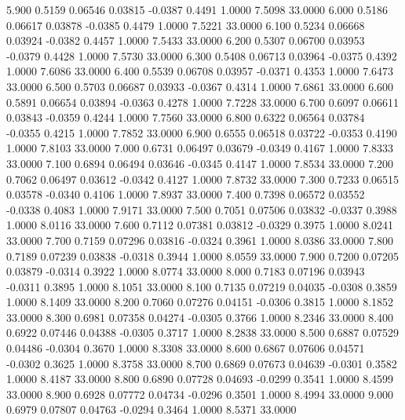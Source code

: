    5.900   0.5159   0.06546   0.03815  -0.0387   0.4491   1.0000   7.5098  33.0000
   6.000   0.5186   0.06617   0.03878  -0.0385   0.4479   1.0000   7.5221  33.0000
   6.100   0.5234   0.06668   0.03924  -0.0382   0.4457   1.0000   7.5433  33.0000
   6.200   0.5307   0.06700   0.03953  -0.0379   0.4428   1.0000   7.5730  33.0000
   6.300   0.5408   0.06713   0.03964  -0.0375   0.4392   1.0000   7.6086  33.0000
   6.400   0.5539   0.06708   0.03957  -0.0371   0.4353   1.0000   7.6473  33.0000
   6.500   0.5703   0.06687   0.03933  -0.0367   0.4314   1.0000   7.6861  33.0000
   6.600   0.5891   0.06654   0.03894  -0.0363   0.4278   1.0000   7.7228  33.0000
   6.700   0.6097   0.06611   0.03843  -0.0359   0.4244   1.0000   7.7560  33.0000
   6.800   0.6322   0.06564   0.03784  -0.0355   0.4215   1.0000   7.7852  33.0000
   6.900   0.6555   0.06518   0.03722  -0.0353   0.4190   1.0000   7.8103  33.0000
   7.000   0.6731   0.06497   0.03679  -0.0349   0.4167   1.0000   7.8333  33.0000
   7.100   0.6894   0.06494   0.03646  -0.0345   0.4147   1.0000   7.8534  33.0000
   7.200   0.7062   0.06497   0.03612  -0.0342   0.4127   1.0000   7.8732  33.0000
   7.300   0.7233   0.06515   0.03578  -0.0340   0.4106   1.0000   7.8937  33.0000
   7.400   0.7398   0.06572   0.03552  -0.0338   0.4083   1.0000   7.9171  33.0000
   7.500   0.7051   0.07506   0.03832  -0.0337   0.3988   1.0000   8.0116  33.0000
   7.600   0.7112   0.07381   0.03812  -0.0329   0.3975   1.0000   8.0241  33.0000
   7.700   0.7159   0.07296   0.03816  -0.0324   0.3961   1.0000   8.0386  33.0000
   7.800   0.7189   0.07239   0.03838  -0.0318   0.3944   1.0000   8.0559  33.0000
   7.900   0.7200   0.07205   0.03879  -0.0314   0.3922   1.0000   8.0774  33.0000
   8.000   0.7183   0.07196   0.03943  -0.0311   0.3895   1.0000   8.1051  33.0000
   8.100   0.7135   0.07219   0.04035  -0.0308   0.3859   1.0000   8.1409  33.0000
   8.200   0.7060   0.07276   0.04151  -0.0306   0.3815   1.0000   8.1852  33.0000
   8.300   0.6981   0.07358   0.04274  -0.0305   0.3766   1.0000   8.2346  33.0000
   8.400   0.6922   0.07446   0.04388  -0.0305   0.3717   1.0000   8.2838  33.0000
   8.500   0.6887   0.07529   0.04486  -0.0304   0.3670   1.0000   8.3308  33.0000
   8.600   0.6867   0.07606   0.04571  -0.0302   0.3625   1.0000   8.3758  33.0000
   8.700   0.6869   0.07673   0.04639  -0.0301   0.3582   1.0000   8.4187  33.0000
   8.800   0.6890   0.07728   0.04693  -0.0299   0.3541   1.0000   8.4599  33.0000
   8.900   0.6928   0.07772   0.04734  -0.0296   0.3501   1.0000   8.4994  33.0000
   9.000   0.6979   0.07807   0.04763  -0.0294   0.3464   1.0000   8.5371  33.0000

